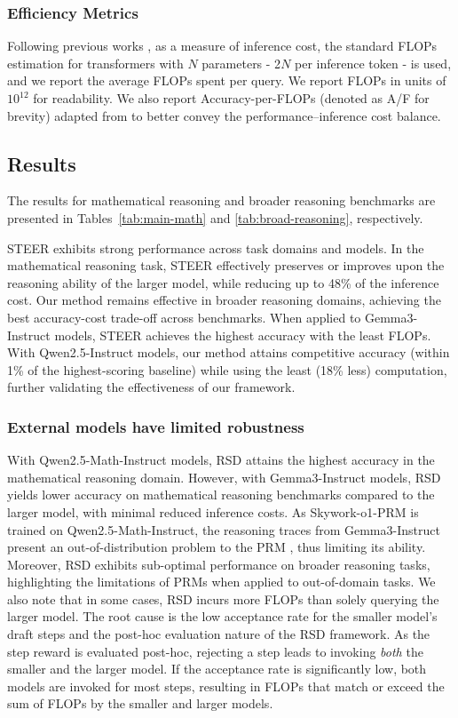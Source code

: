 \documentclass[letterpaper]{article} %
\begin{document}
\subsubsection{Efficiency Metrics}
Following previous works \citep{liaoreward,DBLP:conf/icml/SardanaPDF24,kaplan2020scaling}, as a measure of inference cost, the standard FLOPs estimation for transformers with $N$ parameters - 2$N$ per inference token - is used, and we report the average FLOPs spent per query. We report FLOPs in units of $10^{12}$ for readability. We also report Accuracy-per-FLOPs (denoted as A/F for brevity) adapted from \citet{ma-etal-2025-cot} to better convey the performance–inference cost balance.

\subsection{Results}
The results for mathematical reasoning and broader reasoning benchmarks are presented in Tables~\ref{tab:main-math} and \ref{tab:broad-reasoning}, 
respectively. 

STEER exhibits strong performance across task domains and models. In the mathematical reasoning task, STEER effectively preserves or improves upon the reasoning ability of the larger model, while reducing up to 48\% of the inference cost. Our method remains effective in broader reasoning domains, achieving the best accuracy-cost trade-off across benchmarks. When applied to Gemma3-Instruct models, STEER achieves the highest accuracy with the least FLOPs. With Qwen2.5-Instruct models, our method attains competitive accuracy (within 1\% of the highest-scoring baseline) while using the least (18\% less) computation, further validating the effectiveness of our framework.

\subsubsection{External models have limited robustness}
With Qwen2.5\allowbreak{}-Math\allowbreak{}-Instruct models, RSD attains the highest accuracy in the mathematical reasoning domain. However, with Gemma3-Instruct models, RSD yields lower accuracy on mathematical reasoning benchmarks compared to the larger model, with minimal reduced inference costs. As Skywork-o1-PRM is trained on Qwen2.5-Math-Instruct, the reasoning traces from Gemma3-Instruct present an out-of-distribution problem to the PRM \citep{zhu-etal-2025-retrieval}, thus limiting its ability. Moreover, RSD exhibits sub-optimal performance on broader reasoning tasks, highlighting the limitations of PRMs \citep{zeng2025versaprm} when applied to out-of-domain tasks. We also note that in some cases, RSD incurs more FLOPs than solely querying the larger model. The root cause is the low acceptance rate for the smaller model’s draft steps and the post-hoc evaluation nature of the RSD framework. As the step reward is evaluated post-hoc, rejecting a step leads to invoking \textit{both} the smaller and the larger model. If the acceptance rate is significantly low, both models are invoked for most steps, resulting in FLOPs that match or exceed the sum of FLOPs by the smaller and larger models. 
\end{document}

